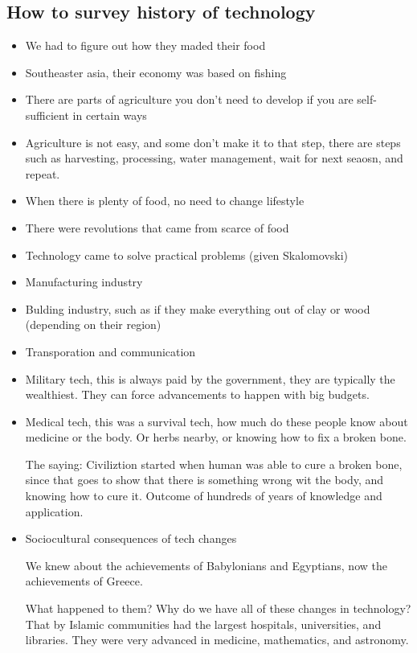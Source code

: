 \documentclass{article}
\begin{document}
\subsection{How to survey history of technology}
\begin{itemize}
  \item We had to figure out how they maded their food
  \item Southeaster asia, their economy was based on fishing
  \item There are parts of agriculture you don't need to develop
    if you are self-sufficient in certain ways
  \item Agriculture is not easy, and some don't make it to that step,
    there are steps such as harvesting, processing, water management,
    wait for next seaosn, and repeat.
  \item When there is plenty of food, no need to change lifestyle
  \item There were revolutions that came from scarce of food
  \item Technology came to solve practical problems (given Skalomovski)
  \item Manufacturing industry
  \item Bulding industry,
    such as if they make everything out of clay or wood (depending on their region)
  \item Transporation and communication
  \item Military tech, this is always paid by the government,
    they are typically the wealthiest. They can
    force advancements to happen with big budgets.
  \item Medical tech, this was a survival tech,
    how much do these people know about medicine or the body.
    Or herbs nearby,
    or knowing how to fix a broken bone.

    The saying: Civiliztion started when human was able to cure a broken bone,
    since that goes to show that there is something wrong wit the body,
    and knowing how to cure it. Outcome of hundreds of years of knowledge and application.
  \item Sociocultural consequences of tech changes

    We knew about the achievements of Babylonians and Egyptians,
    now the achievements of Greece.

    What happened to them? Why do we have all of these changes in technology?
    That by Islamic communities had the largest hospitals, universities, and libraries.
    They were very advanced in medicine, mathematics, and astronomy.


\end{itemize}
\end{document}
